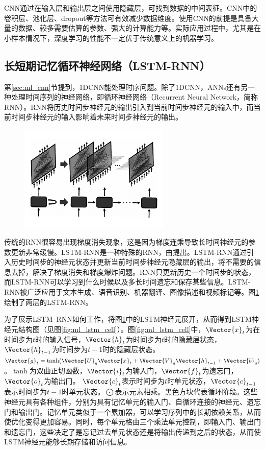 CNN通过在输入层和输出层之间使用隐藏层，可找到数据的中间表征。CNN中的卷积层、池化层、dropout等方法可有效减少数据维度。使用CNN的前提是具备大量的数据、较多需要估算的参数、强大的计算能力等。实际应用过程中，尤其是在小样本情况下，深度学习的性能不一定优于传统意义上的机器学习。

\subsection{长短期记忆循环神经网络（LSTM-RNN）}\label{sec:ml_lstm}

第\ref{sec:ml_cnn}节提到，1DCNN能处理时序问题。除了1DCNN，ANNs还有另一种处理时间序列的神经网络，即循环神经网络（Recurrent Neural Network，简称RNN）。RNN将历史时间步神经元的输出引入到当前时间步神经元的输入中，而当前时间步神经元的输入影响着未来时间步神经元的输出。

\begin{figure}[!htbp]
  \centering
  \noindent\includegraphics[width=72mm]{Img/chap2_ml/lstm_rnn}
  \label{fig:ml_lstm_rnn}
\end{figure}

传统的RNN很容易出现梯度消失现象，这是因为梯度连乘导致长时间神经元的参数更新非常缓慢。LSTM-RNN是一种特殊的RNN，由\citet{hochreiter1997long}提出。LSTM-RNN通过引入历史时间步的神经元状态并更新当前时间步神经元隐藏层的输出，将不需要的信息去掉，解决了梯度消失和梯度爆炸问题。RNN只更新历史一个时间步的状态，而LSTM-RNN可以学习到什么时候以及多长时间遗忘和保存某些信息。LSTM-RNN被广泛应用于文本生成、语音识别、机器翻译、图像描述和视频标记等。图\ref{fig:ml_lstm_rnn}绘制了两层的LSTM-RNN。

为了展示LSTM–RNN如何工作，将图\ref{fig:ml_lstm_rnn}中的LSTM神经元展开，从而得到LSTM神经元结构图（见图\ref{fig:ml_lstm_cell}）。图\ref{fig:ml_lstm_cell}中，$\Vector{x}_t$为在时间步为$t$时的输入信号，$\Vector{h}_{t}$为时间步为$t$时的隐藏层状态，$\Vector{h}_{t-1}$为时间步为$t-1$时的隐藏层状态。$\Vector{g}_t=\tanh(\Vector{U}_g\Vector{x}_t+\Vector{V}_g\Vector{h}_{t-1}+\Vector{b}_g)$。$\tanh$为双曲正切函数，$\Vector{i}_t$为输入门，$\Vector{f}_t$为遗忘门，$\Vector{o}_t$为输出门。 $\Vector{c}_t$表示时间步为$t$时单元状态，$\Vector{c}_{t-1}$ 表示时间步为$t-1$时单元状态。$\bigodot$表示元素相乘。黑色方块代表循环阶段。这些神经元具有各种组件，分别为具有记忆单元的输入门、自循环连接的神经元、遗忘门和输出门。记忆单元类似于一个累加器，可以学习序列中的长期依赖关系，从而使优化变得更加容易。同时，每个单元格由三个乘法单元控制，即输入门、输出门和遗忘门，这些决定了是忘记过去单元状态还是将输出传递到之后的状态，从而使LSTM神经元能够长期存储和访问信息。

